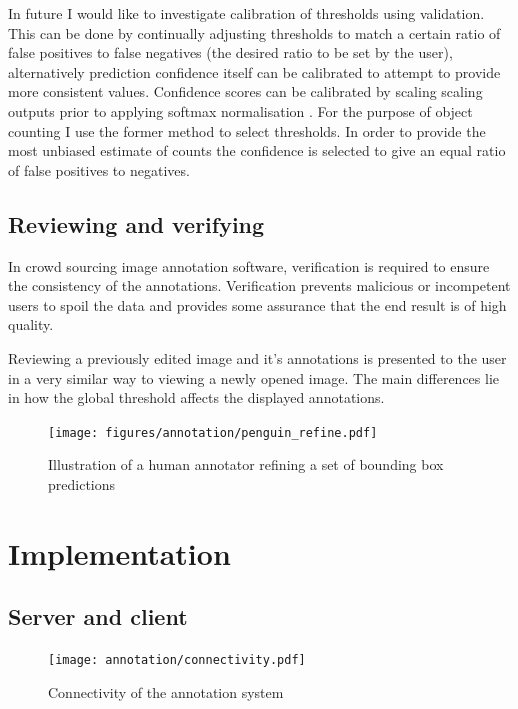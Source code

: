 In future I would like to investigate calibration of thresholds using validation. This can be done by continually adjusting thresholds to match a certain ratio of false positives to false negatives (the desired ratio to be set by the user), alternatively prediction confidence itself can be calibrated to attempt to provide more consistent values. Confidence scores can be calibrated by scaling scaling outputs prior to applying softmax normalisation \cite{Guo2017}. For the purpose of object counting I use the former method to select thresholds. In order to provide the most unbiased estimate of counts the confidence is selected to give an equal ratio of false positives to negatives.
 

\subsection {Reviewing and verifying}

In crowd sourcing image annotation software, verification is required to ensure the consistency of the annotations. Verification prevents malicious or incompetent users to spoil the data and provides some assurance that the end result is of high quality. 

Reviewing a previously edited image and it's annotations is presented to the user in a very similar way to viewing a newly opened image. The main differences lie in how the global threshold affects the displayed annotations. 


\begin{figure}[h!]
  \centering
  \texttt{[image: figures/annotation/penguin\_refine.pdf]}
  \caption{Illustration of a human annotator refining a set of bounding box predictions }   
  \label{fig:penguin_refinement}
\end{figure}


\section {Implementation}

\subsection{Server and client}

\begin{figure}[h!]
  \centering
  \texttt{[image: annotation/connectivity.pdf]}
  \caption{Connectivity of the annotation system}  
  \label{fig:connectivity}
\end{figure}


